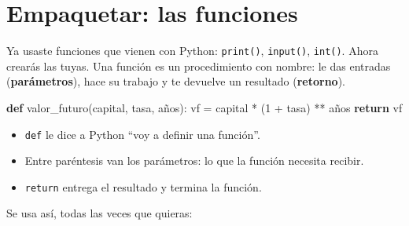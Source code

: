 \documentclass[
  spanish,
  letterpaper,
  DIV=11,
  numbers=noendperiod]{scrreprt}
\newenvironment{Shaded}{\begin{snugshade}}{\end{snugshade}}
\newcommand{\BuiltInTok}[1]{\textcolor[rgb]{0.00,0.23,0.31}{#1}}
\newcommand{\ControlFlowTok}[1]{\textcolor[rgb]{0.00,0.23,0.31}{\textbf{#1}}}
\newcommand{\DecValTok}[1]{\textcolor[rgb]{0.68,0.00,0.00}{#1}}
\newcommand{\FloatTok}[1]{\textcolor[rgb]{0.68,0.00,0.00}{#1}}
\newcommand{\KeywordTok}[1]{\textcolor[rgb]{0.00,0.23,0.31}{\textbf{#1}}}
\newcommand{\NormalTok}[1]{\textcolor[rgb]{0.00,0.23,0.31}{#1}}
\newcommand{\OperatorTok}[1]{\textcolor[rgb]{0.37,0.37,0.37}{#1}}
\newcommand{\SpecialCharTok}[1]{\textcolor[rgb]{0.37,0.37,0.37}{#1}}
\newcommand{\SpecialStringTok}[1]{\textcolor[rgb]{0.13,0.47,0.30}{#1}}
\providecommand{\tightlist}{%
  \setlength{\itemsep}{0pt}\setlength{\parskip}{0pt}}
\begin{document}
\section{Empaquetar: las funciones}\label{empaquetar-las-funciones}

Ya usaste funciones que vienen con Python: \texttt{print()},
\texttt{input()}, \texttt{int()}. Ahora crearás las tuyas. Una función
es un procedimiento con nombre: le das entradas (\textbf{parámetros}),
hace su trabajo y te devuelve un resultado (\textbf{retorno}).

\begin{Shaded}
\begin{Highlighting}[]
\KeywordTok{def}\NormalTok{ valor\_futuro(capital, tasa, años):}
\NormalTok{    vf }\OperatorTok{=}\NormalTok{ capital }\OperatorTok{*}\NormalTok{ (}\DecValTok{1} \OperatorTok{+}\NormalTok{ tasa) }\OperatorTok{**}\NormalTok{ años}
    \ControlFlowTok{return}\NormalTok{ vf}
\end{Highlighting}
\end{Shaded}

\begin{itemize}
\tightlist
\item
  \texttt{def} le dice a Python ``voy a definir una función''.
\item
  Entre paréntesis van los parámetros: lo que la función necesita
  recibir.
\item
  \texttt{return} entrega el resultado y termina la función.
\end{itemize}

Se usa así, todas las veces que quieras:

\begin{Shaded}
\end{Shaded}
\end{document}
